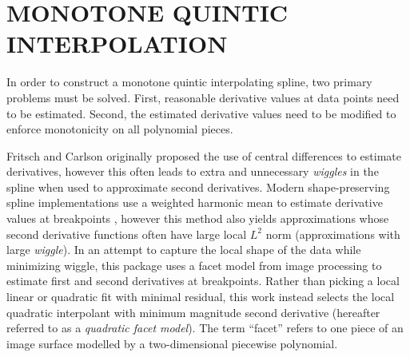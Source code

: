 
\section{MONOTONE QUINTIC INTERPOLATION}

In order to construct a monotone quintic interpolating spline, two
primary problems must be solved. First, reasonable derivative values
at data points need to be estimated. Second, the estimated derivative
values need to be modified to enforce monotonicity on all polynomial
pieces.

Fritsch and Carlson \cite{fritsch1980monotone} originally proposed the
use of central differences to estimate derivatives, however this often
leads to extra and unnecessary {\it wiggles} in the spline when used
to approximate second derivatives. Modern shape-preserving spline
implementations use a weighted harmonic mean to estimate derivative
values at breakpoints \cite{moler2004numerical}, however this method
also yields approximations whose second derivative functions often
have large local $L^2$ norm (approximations with large {\it
  wiggle}). In an attempt to capture the local shape of the data while
minimizing wiggle, this package uses a facet model from image
processing \cite{haralick1981facet} to estimate first and second
derivatives at breakpoints. Rather than picking a local linear or
quadratic fit with minimal residual, this work instead selects the
local quadratic interpolant with minimum magnitude second derivative
(hereafter referred to as a {\it quadratic facet model}). The term
``facet'' refers to one piece of an image surface modelled by a
two-dimensional piecewise polynomial.

